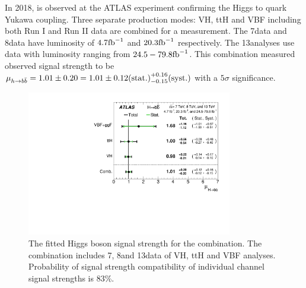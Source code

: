
\label{sec:vbf-hbbcomb}

In 2018, \Hbb is observed at the ATLAS experiment \cite{VHPaper} confirming the Higgs to quark Yukawa coupling. Three separate \Hbb production modes: VH, ttH and VBF including both Run I and Run II data are combined for a measurement. The 7\TeV data and 8\TeV data have luminosity of $4.7\rm{fb}^{-1}$ and $20.3\rm{fb}^{-1}$ respectively. The 13\TeV analyses use data with luminosity ranging from $24.5-79.8\rm{fb}^{-1}$. This combination measured observed signal strength to be $\mu_{h \rightarrow b\bar{b}}= 1.01 \pm 0.20 = 1.01 \pm 0.12\text{(stat.)}^{+0.16}_{-0.15}\text{(syst.)}$ with a $5\sigma$ significance.


\begin{figure}[htbp]
  \centering
 \includegraphics[width=0.8\textwidth]{figures/VBF/HbbComb.pdf}
 \caption{The fitted Higgs boson signal strength for the \Hbb combination. The combination includes 7\TeV, 8\TeV and 13\TeV data of VH, ttH and VBF analyses. Probability of signal strength compatibility of individual channel signal strengths is 83\%.}
  \label{fig:vbf-combination-hbb}
\end{figure}




